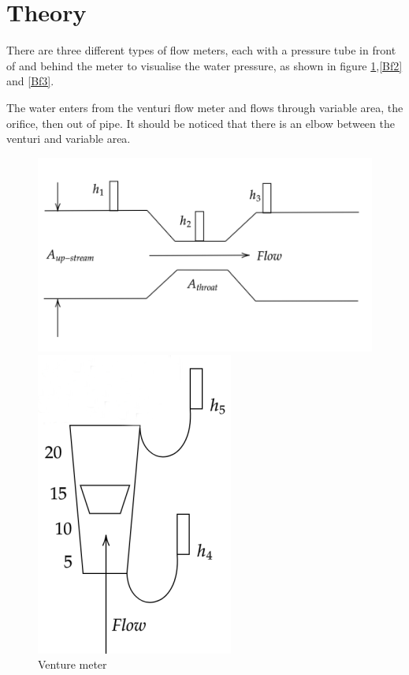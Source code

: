 \section{Theory}
There are three different types of flow meters, 
each with a pressure tube in front of and behind the 
meter to visualise the water pressure, as shown in figure \ref{Bf1},\ref{Bf2} and \ref{Bf3}.

The water enters from the venturi flow meter and flows through variable area, the orifice, 
then out of pipe. It should be noticed that there is an elbow between the venturi and variable area.

\begin{figure}
    \centering
\begin{minipage}[h]{0.33\textwidth} %
    \centering
    \includegraphics[scale=0.5]{Results/B1.png}
    \caption{Venture meter}
    \label{Bf1}
\end{minipage}
\begin{minipage}[h]{0.3\textwidth}%
    \centering
    \includegraphics[scale=0.5]{Results/B3.png}

\end{minipage}
\end{figure}
